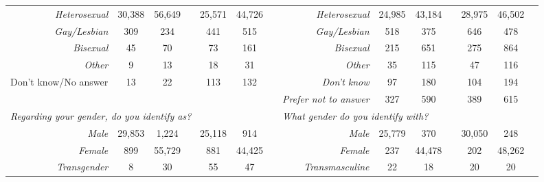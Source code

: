 \begin{table}[htpb]
{\begin{tabular}{lcclccl|rcclccl}
\multicolumn{1}{r}{\textit{Heterosexual}}         & 30,388 & 56,649 &  & 25,571 & 44,726 &  & \textit{Heterosexual}               & 24,985 & 43,184 &  & 28,975 & 46,502 &  \\
\multicolumn{1}{r}{\textit{Gay/Lesbian}}          & 309 & 234 &  & 441 & 515 &  & \textit{Gay/Lesbian}                & 518 & 375 &  & 646 & 478 &  \\
\multicolumn{1}{r}{\textit{Bisexual}}             & 45 & 70 &  & 73 & 161 &  & \textit{Bisexual}                   & 215 & 651 &  & 275 & 864 &  \\
\multicolumn{1}{r}{\textit{Other}}                & 9 & 13 &  & 18 & 31 &  & \textit{Other}                      & 35 & 115 &  & 47 & 116 &  \\
\multicolumn{1}{r}{Don't know/No answer}          & 13 & 22 &  & 113 & 132 &  & \textit{Don't know}                 & 97 & 180 &  & 104 & 194 &  \\
                                                  & \multicolumn{1}{l}{} & \multicolumn{1}{l}{} &  & \multicolumn{1}{l}{} & \multicolumn{1}{l}{} &  & \textit{Prefer not to answer}       & 327 & 590 &  & 389 & 615 &  \\ \hline
\multicolumn{6}{l}{\textit{Regarding your gender, do you identify as?}}                                                                                                                                                                                                                                                                                                                                                      &  & \multicolumn{6}{l}{\textit{What gender do you identify with?}}                                                                                                                                                                                                                                                                                                                                                               &  \\
\multicolumn{1}{r}{\textit{Male}}                 & 29,853 & 1,224 &  & 25,118 & 914 &  & \textit{Male}                       & 25,779 & 370 &  & 30,050 & 248 &  \\
\multicolumn{1}{r}{\textit{Female}}               & 899 & 55,729 &  & 881 & 44,425 &  & \textit{Female}                     & 237 & 44,478 &  & 202 & 48,262 &  \\
\multicolumn{1}{r}{\textit{Transgender}}          & 8 & 30 &  & 55 & 47 &  & \textit{Transmasculine}             & 22 & 18 &  & 20 & 20 &  \\

\end{tabular}}
\end{table}
